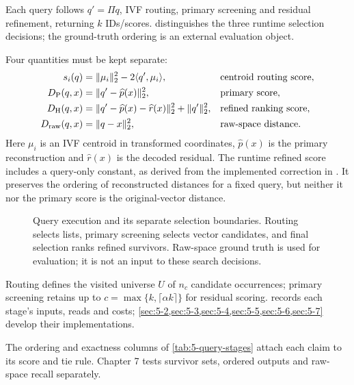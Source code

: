 Each query follows $q'=\Pi q$, IVF routing, primary screening and residual refinement, returning $k$ IDs/scores.  distinguishes the
three runtime selection decisions; the ground-truth ordering is an
external evaluation object.

Four quantities must be kept separate:
\begin{align}
 s_i(q)&=\|\mu_i\|_2^2-2\langle q',\mu_i\rangle,
                   &&\text{centroid routing score},\nonumber\\
 D_{\mathrm{P}}(q,x)&=\|q'-\widehat p(x)\|_2^2,
                   &&\text{primary score},\nonumber\\
 D_{\mathrm{H}}(q,x)&=\|q'-\widehat p(x)-\widehat r(x)\|_2^2
                       +\|q'\|_2^2,
                   &&\text{refined ranking score},\nonumber\\
 D_{\mathrm{raw}}(q,x)&=\|q-x\|_2^2,
                   &&\text{raw-space distance}.
 \label{eq:5-ranking-objects}
\end{align}
Here $\mu_i$ is an IVF centroid in transformed coordinates,
$\widehat p(x)$ is the primary reconstruction and $\widehat r(x)$ is
the decoded residual. The runtime refined score includes a query-only
constant, as derived from the implemented correction in .
It preserves the ordering of reconstructed distances for a fixed query,
but neither it nor the primary score is the original-vector distance.

\begin{figure}[tbp]
\centering

\caption[Query stages and selection boundaries]{Query execution and its separate selection boundaries. Routing
selects lists, primary screening selects vector candidates, and final
selection ranks refined survivors. Raw-space ground truth is used for
evaluation; it is not an input to these search decisions.}
\label{fig:5-query-path}
\end{figure}

Routing defines the visited universe $U$ of $n_c$ candidate occurrences;
primary screening retains up to $c=\max\{k,\lceil\alpha k\rceil\}$ for
residual scoring.  records each stage's inputs,
reads and costs; \cref{sec:5-2,sec:5-3,sec:5-4,sec:5-5,sec:5-6,sec:5-7}
develop their implementations.

The ordering and exactness columns of \cref{tab:5-query-stages}
attach each claim to its score and tie rule. Chapter 7 tests survivor
sets, ordered outputs and raw-space recall separately.


